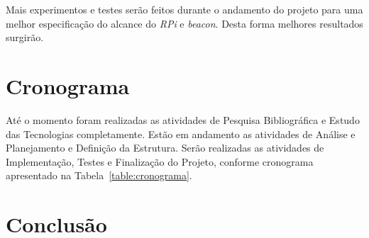 \documentclass[
	12pt,				%
	openright,			%
	oneside,			%
	a4paper,			%
	chapter=TITLE,		%
	english,			%
	brazil				%
	]{abntex2}
\begin{document}
{Mais experimentos e testes serão feitos durante o andamento do projeto para uma melhor especificação do alcance do \textit{RPi} e \textit{beacon}. Desta forma melhores resultados surgirão.

\chapter{Cronograma}

Até o momento foram realizadas as atividades de Pesquisa Bibliográfica e Estudo das Tecnologias completamente. Estão em andamento as atividades de Análise e Planejamento e Definição da Estrutura. Serão realizadas as atividades de Implementação, Testes e Finalização do Projeto, conforme cronograma apresentado na Tabela~\ref{table:cronograma}.

\begin{table}[htb]
\end{table}



\chapter{Conclusão}

}
\end{document}
